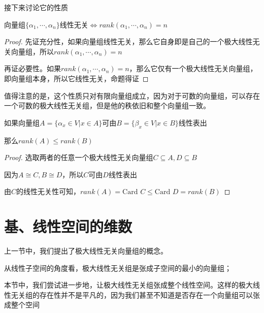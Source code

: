\documentclass[12pt, a4paper, oneside, UTF8]{ctexbook}
\begin{document}
			接下来讨论它的性质
			\begin{para}{0}
				\point{}
					\begin{proposition}
						向量组$\{\alpha_1,\cdots,\alpha_n\}$线性无关$\Leftrightarrow rank(\alpha_1,\cdots,\alpha_n)=n$
					\end{proposition}
					\begin{proof}
						先证充分性，如果向量组线性无关，那么它自身即是自己的一个极大线性无关向量组，所以$rank(\alpha_1,\cdots,\alpha_n)=n$

						再证必要性。如果$rank(\alpha_1,\cdots,\alpha_n)=n$，那么它仅有一个极大线性无关向量组，即向量组本身，所以它线性无关，命题得证
					\end{proof}
					值得注意的是，这个性质只对有限向量组成立，因为对于可数的向量组，可以存在一个可数的极大线性无关组，但是他的秩依旧和整个向量组一致。
				\point{}
					\begin{proposition}
						如果向量组$A=\{\alpha_x \in V| x\in A\}$可由$B=\{\beta_x \in V|x \in B\}$线性表出

						那么$rank(A) \leqslant rank(B)$
					\end{proposition}
					\begin{proof}
						选取两者的任意一个极大线性无关向量组$C \subseteq A,D\subseteq B$

						因为$A \cong C,B \cong D$，所以$C$可由$D$线性表出

						由$C$的线性无关性可知，$rank(A) = \text{Card }C \leqslant \text{Card }D = rank(B)$
					\end{proof}
			\end{para}
	\section{基、线性空间的维数}
		上一节中，我们提出了极大线性无关向量组的概念。

		从线性子空间的角度看，极大线性无关组是张成子空间的最小的向量组；

		本节中，我们尝试进一步地，让极大线性无关组张成整个线性空间。这样的极大线性无关组的存在性并不是平凡的，因为我们甚至不知道是否存在一个向量组可以张成整个空间
\end{document}
